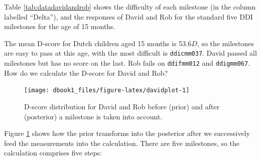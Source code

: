 \documentclass[
]{book}
\begin{document}
\begin{table}

\caption{\label{tab:datadavidandrob}Scores of David and Rob on five milestones from the DDI}
\centering
{}
\end{table}

Table \ref{tab:datadavidandrob} shows the difficulty of each milestone (in the column labelled ``Delta''), and the responses of David and Rob for the standard five DDI milestones for the age of 15 months.

The mean D-score for Dutch children aged 15 months is 53.6\(D\), so the milestones are easy to pass at this age, with the most difficult is \texttt{ddicmm037}. David passed all milestones but has no score on the last. Rob fails on \texttt{ddifmm012} and \texttt{ddigmm067}. How do we calculate the D-score for David and Rob?

\begin{figure}

{\centering \texttt{[image: dbook1\_files/figure-latex/davidplot-1]} 

}

\caption{D-score distribution for David and Rob before (prior) and after (posterior) a milestone is taken into account.}\label{fig:davidplot}
\end{figure}



Figure \ref{fig:davidplot} shows how the prior transforms into the posterior after we successively feed the measurements into the calculation. There are five milestones, so the calculation comprises five steps:
\end{document}
